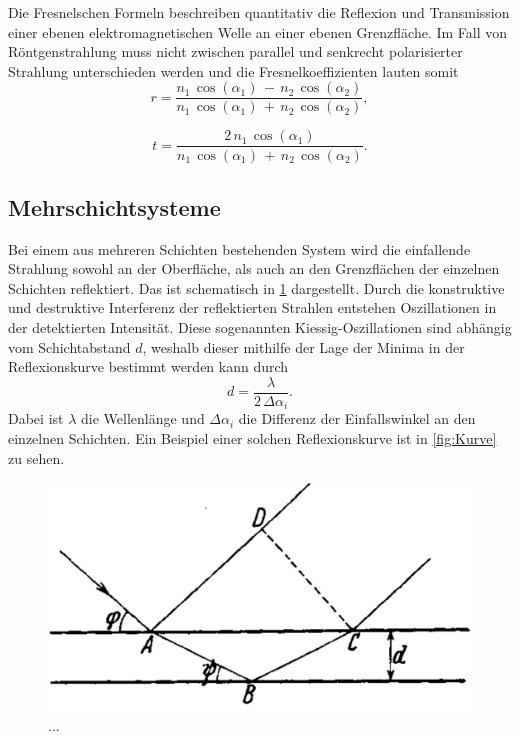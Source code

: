 Die Fresnelschen Formeln beschreiben quantitativ die Reflexion und Transmission einer ebenen elektromagnetischen Welle an einer ebenen Grenzfläche. %
Im Fall von Röntgenstrahlung muss nicht zwischen parallel und senkrecht polarisierter Strahlung unterschieden werden und die Fresnelkoeffizienten lauten somit
\begin{equation}
    r = \frac{n_1 \, \cos(\alpha_1) \, - \, n_2 \, \cos(\alpha_2)}{n_1 \, \cos(\alpha_1) \, + \, n_2 \, \cos(\alpha_2)},
\end{equation}

\begin{equation*}
    t = \frac{2 \, n_1 \, \cos(\alpha_1)}{n_1 \, \cos(\alpha_1) \, + \, n_2 \, \cos(\alpha_2)}.
\end{equation*}


\subsection{Mehrschichtsysteme}
Bei einem aus mehreren Schichten bestehenden System wird die einfallende Strahlung sowohl an der Oberfläche, als auch an den Grenzflächen der einzelnen Schichten reflektiert. Das ist schematisch in \ref{fig:Kiessig} dargestellt.
Durch die konstruktive und destruktive Interferenz der reflektierten Strahlen entstehen Oszillationen in der detektierten Intensität. Diese sogenannten Kiessig-Oszillationen sind abhängig vom Schichtabstand $d$, weshalb dieser mithilfe der Lage der Minima in der Reflexionskurve bestimmt werden kann durch
\begin{equation}
    d = \frac{\lambda}{2 \, \Delta \alpha_i}.
\end{equation}
Dabei ist $\lambda$ die Wellenlänge und $\Delta \alpha_i$ die Differenz der Einfallswinkel an den einzelnen Schichten.
Ein Beispiel einer solchen Reflexionskurve ist in \ref{fig:Kurve} zu sehen.

\begin{figure}
    \centering
    \includegraphics[width=0.5\linewidth]{./figures/Kiessig.png}
    \caption{...}
    \label{fig:Kiessig}
\end{figure}

